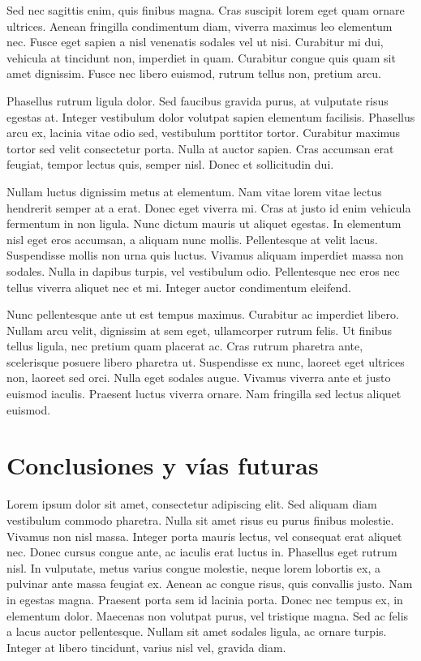 Sed nec sagittis enim, quis finibus magna. Cras suscipit lorem eget quam ornare ultrices. Aenean fringilla condimentum diam, viverra maximus leo elementum nec. Fusce eget sapien a nisl venenatis sodales vel ut nisi. Curabitur mi dui, vehicula at tincidunt non, imperdiet in quam. Curabitur congue quis quam sit amet dignissim. Fusce nec libero euismod, rutrum tellus non, pretium arcu.

Phasellus rutrum ligula dolor. Sed faucibus gravida purus, at vulputate risus egestas at. Integer vestibulum dolor volutpat sapien elementum facilisis. Phasellus arcu ex, lacinia vitae odio sed, vestibulum porttitor tortor. Curabitur maximus tortor sed velit consectetur porta. Nulla at auctor sapien. Cras accumsan erat feugiat, tempor lectus quis, semper nisl. Donec et sollicitudin dui.

Nullam luctus dignissim metus at elementum. Nam vitae lorem vitae lectus hendrerit semper at a erat. Donec eget viverra mi. Cras at justo id enim vehicula fermentum in non ligula. Nunc dictum mauris ut aliquet egestas. In elementum nisl eget eros accumsan, a aliquam nunc mollis. Pellentesque at velit lacus. Suspendisse mollis non urna quis luctus. Vivamus aliquam imperdiet massa non sodales. Nulla in dapibus turpis, vel vestibulum odio. Pellentesque nec eros nec tellus viverra aliquet nec et mi. Integer auctor condimentum eleifend.

Nunc pellentesque ante ut est tempus maximus. Curabitur ac imperdiet libero. Nullam arcu velit, dignissim at sem eget, ullamcorper rutrum felis. Ut finibus tellus ligula, nec pretium quam placerat ac. Cras rutrum pharetra ante, scelerisque posuere libero pharetra ut. Suspendisse ex nunc, laoreet eget ultrices non, laoreet sed orci. Nulla eget sodales augue. Vivamus viverra ante et justo euismod iaculis. Praesent luctus viverra ornare. Nam fringilla sed lectus aliquet euismod.


\chapter{Conclusiones y vías futuras}

Lorem ipsum dolor sit amet, consectetur adipiscing elit. Sed aliquam diam vestibulum commodo pharetra. Nulla sit amet risus eu purus finibus molestie. Vivamus non nisl massa. Integer porta mauris lectus, vel consequat erat aliquet nec. Donec cursus congue ante, ac iaculis erat luctus in. Phasellus eget rutrum nisl. In vulputate, metus varius congue molestie, neque lorem lobortis ex, a pulvinar ante massa feugiat ex. Aenean ac congue risus, quis convallis justo. Nam in egestas magna. Praesent porta sem id lacinia porta. Donec nec tempus ex, in elementum dolor. Maecenas non volutpat purus, vel tristique magna. Sed ac felis a lacus auctor pellentesque. Nullam sit amet sodales ligula, ac ornare turpis. Integer at libero tincidunt, varius nisl vel, gravida diam.

